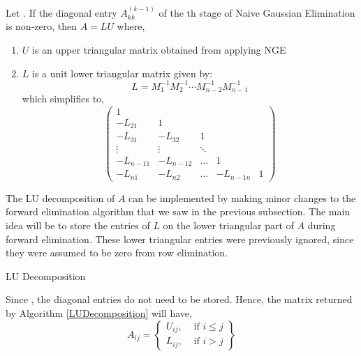 \begin{thm}
	Let . If the diagonal entry $A_{kk}^{(k-1)}$ of the th stage of Naive Gaussian Elimination is non-zero, then $A = LU$ where,
	\begin{enumerate}
		\item $U$ is an upper triangular matrix obtained from applying NGE
		\item $L$ is a unit lower triangular matrix given by:
		\[L=M_1^{-1} M_2^{-1} \cdots M_{n-2}^{-1} M_{n-1}^{-1}\]
		which simplifies to,
		\[\left(\begin{array}{ccccc}
		1 & & & & \\
		-L_{21} & 1 & & & \\
		-L_{31} & -L_{32} & 1 & & \\
		\vdots & \vdots & \ddots & & \\
		-L_{n-11} & -L_{n-12} & \ldots & 1 & \\
		-L_{n 1} & -L_{n 2} & \ldots & -L_{n-1 n} & 1
		\end{array}\right)\]
	\end{enumerate}
\end{thm}

\NewLine

The LU decomposition of $A$ can be implemented by making minor changes to the forward elimination algorithm that we saw in the previous subsection. The main idea will be to store the entries of $L$ on the lower triangular part of $A$ during forward elimination. These lower triangular entries were previously ignored, since they were assumed to be zero from row elimination.

\NewLine

\begin{algorithm}
	  \caption{LU Decomposition}\label{LUDecomposition}
\end{algorithm}

\NewLine

\begin{rmk}
	Since , the diagonal entries do not need to be stored. Hence, the matrix returned by Algorithm \ref{LUDecomposition} will have,
	\[A_{i j}=\left\{\begin{array}{ll}
	U_{i j}, & \text { if } i \leq j \\
	L_{i j}, & \text { if } i>j
	\end{array}\right\}\]
\end{rmk}


